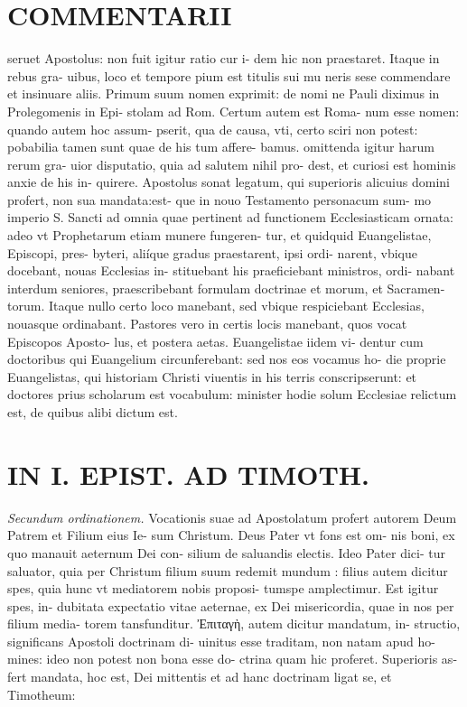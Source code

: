 \documentclass{article}
\begin{document}
\begin{pages}
\section*{COMMENTARII }\pstart seruet Apostolus: non fuit igitur ratio cur i- dem hic non praestaret. Itaque in rebus gra- uibus, loco et tempore pium est titulis sui mu neris sese commendare et insinuare aliis.  \pend\pstart Primum suum nomen exprimit: de nomi ne Pauli diximus in Prolegomenis in Epi- stolam ad Rom. Certum autem est Roma- num esse nomen: quando autem hoc assum- pserit, qua de causa, vti, certo sciri non potest: pobabilia tamen sunt quae de his tum affere- bamus. omittenda igitur harum rerum gra- uior disputatio, quia ad salutem nihil pro- dest, et curiosi est hominis anxie de his in- quirere.  \pend\pstart Apostolus sonat legatum, qui superioris alicuius domini profert, non sua mandata:est- que in nouo Testamento personacum sum- mo imperio S. Sancti ad omnia quae pertinent ad functionem Ecclesiasticam ornata: adeo vt Prophetarum etiam munere fungeren- tur, et quidquid Euangelistae, Episcopi, pres- byteri, aliíque gradus praestarent, ipsi ordi- narent, vbique docebant, nouas Ecclesias in- stituebant his praeficiebant ministros, ordi- nabant interdum seniores, praescribebant formulam doctrinae et morum, et Sacramen- torum. Itaque nullo certo loco manebant, sed vbique respiciebant Ecclesias, nouasque ordinabant. Pastores vero in certis locis  \pend\pstart manebant, quos vocat Episcopos Aposto- lus, et postera aetas. Euangelistae iidem vi- dentur cum doctoribus qui Euangelium circunferebant: sed nos eos vocamus ho- die proprie Euangelistas, qui historiam Christi viuentis in his terris conscripserunt: et doctores prius scholarum est vocabulum: minister hodie solum Ecclesiae relictum est, de quibus alibi dictum est.  \pend
\section*{IN I. EPIST. AD TIMOTH. }
\textit{Secundum ordinationem. }\pstart Vocationis suae ad Apostolatum profert autorem Deum Patrem et Filium eius Ie- sum Christum. Deus Pater vt fons est om- nis boni, ex quo manauit aeternum Dei con- silium de saluandis electis. Ideo Pater dici- tur saluator, quia per Christum filium suum redemit mundum : filius autem dicitur spes, quia hunc vt mediatorem nobis proposi- tumspe amplectimur. Est igitur spes, in- dubitata expectatio vitae aeternae, ex Dei misericordia, quae in nos per filium media- torem tansfunditur.  \pend
\marginpar{[ p.11 ]}\pstart Ἐπιταγὴ, autem dicitur mandatum, in- structio, significans Apostoli doctrinam di- uinitus esse traditam, non natam apud ho- mines: ideo non potest non bona esse do- ctrina quam hic proferet. Superioris as- fert mandata, hoc est, Dei mittentis et ad hanc doctrinam ligat se, et Timotheum:  \pend

\end{pages}
\end{document}
